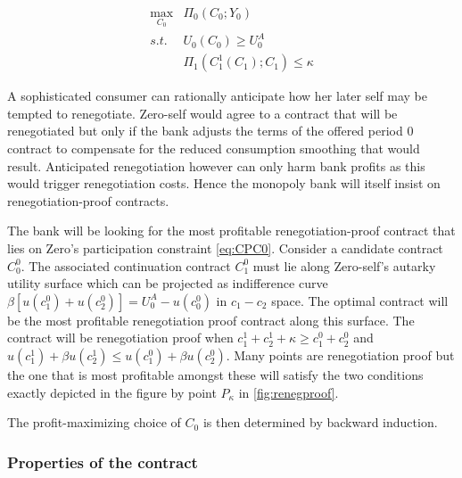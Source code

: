 \documentclass[11pt,english]{article}
\theoremstyle{plain}
\theoremstyle{definition}
\begin{document}
\begin{align}
\max_{C_{0}} & \Pi_{0}\left(C_{0};Y_{0}\right)\\
s.t. & U_{0}\left(C_{0}\right)\geq U_{0}^{A}\\
 & \Pi_{1}\left(C_{1}^{1}\left(C_{1}\right);C_{1}\right)\leq\kappa\label{eq:rpc-m}
\end{align}

A sophisticated consumer can rationally anticipate how her later self
may be tempted to renegotiate. Zero-self would agree to a contract
that will be renegotiated but only if the bank adjusts the terms of
the offered period 0 contract to compensate for the reduced consumption
smoothing that would result. Anticipated renegotiation however can
only harm bank profits as this would trigger renegotiation costs.
Hence the monopoly bank will itself insist on renegotiation-proof
contracts.

The bank will be looking for the most profitable renegotiation-proof
contract that lies on Zero's participation constraint \ref{eq:CPC0}.
Consider a candidate contract $C_{0}^{0}$. The associated continuation
contract $C_{1}^{0}$ must lie along Zero-self's autarky utility surface
which can be projected as indifference curve 
$\beta\left[u(c_{1}^{0})+u(c_{2}^{0})\right]=U_{0}^{A}-u(c_{0}^{0})$
in $c_{1}-c_{2}$ space. The optimal contract will be the most profitable
renegotiation proof contract along this surface. The contract will
be renegotiation proof when $c_{1}^{1}+c_{2}^{1}+\kappa\ge c_{1}^{0}+c_{2}^{0}$
and $u(c_{1}^{1})+\beta u(c_{2}^{1})\le u(c_{1}^{0})+\beta u(c_{2}^{0})$.
Many points are renegotiation proof but the one that is most profitable
amongst these will satisfy the two conditions exactly depicted in
the figure by point $P_{\kappa}$ in \ref{fig:renegproof}.

The profit-maximizing choice
of $C_{0}$ is then determined by backward induction.

\subsubsection{Properties of the contract}\label{sec_contract_properties}
\end{document}
